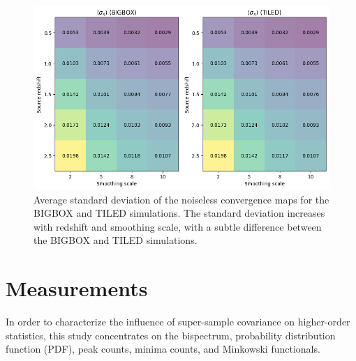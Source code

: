 \begin{figure}[ht]
    \centering
    \includegraphics[width=\textwidth]{figures/avg_sigma0.png}
    \caption{Average standard deviation of the noiseless convergence maps for the BIGBOX and TILED simulations. The standard deviation increases with redshift and smoothing scale, with a subtle difference between the BIGBOX and TILED simulations.} \label{fig:avg_sigma0}
\end{figure}

\section{Measurements}
In order to characterize the influence of super-sample covariance on higher-order statistics, this study concentrates on the bispectrum, probability distribution function (PDF), peak counts, minima counts, and Minkowski functionals. 

